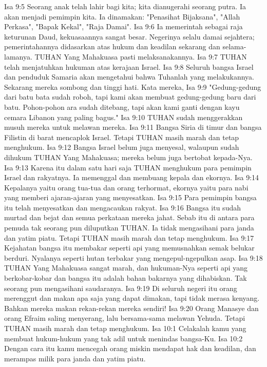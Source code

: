 Isa 9:5  Seorang anak telah lahir bagi kita; kita dianugerahi seorang putra. Ia akan menjadi pemimpin kita. Ia dinamakan: "Penasihat Bijaksana", "Allah Perkasa", "Bapak Kekal", "Raja Damai".
Isa 9:6  Ia memerintah sebagai raja keturunan Daud, kekuasaannya sangat besar. Negerinya selalu damai sejahtera; pemerintahannya didasarkan atas hukum dan keadilan sekarang dan selama-lamanya. TUHAN Yang Mahakuasa pasti melaksanakannya.
Isa 9:7  TUHAN telah menjatuhkan hukuman atas kerajaan Israel.
Isa 9:8  Seluruh bangsa Israel dan penduduk Samaria akan mengetahui bahwa Tuhanlah yang melakukannya. Sekarang mereka sombong dan tinggi hati. Kata mereka,
Isa 9:9  "Gedung-gedung dari batu bata sudah roboh, tapi kami akan membuat gedung-gedung baru dari batu. Pohon-pohon ara sudah ditebang, tapi akan kami ganti dengan kayu cemara Libanon yang paling bagus."
Isa 9:10  TUHAN sudah menggerakkan musuh mereka untuk melawan mereka.
Isa 9:11  Bangsa Siria di timur dan bangsa Filistin di barat mencaplok Israel. Tetapi TUHAN masih marah dan tetap menghukum.
Isa 9:12  Bangsa Israel belum juga menyesal, walaupun sudah dihukum TUHAN Yang Mahakuasa; mereka belum juga bertobat kepada-Nya.
Isa 9:13  Karena itu dalam satu hari saja TUHAN menghukum para pemimpin Israel dan rakyatnya. Ia memenggal dan membuang kepala dan ekornya.
Isa 9:14  Kepalanya yaitu orang tua-tua dan orang terhormat, ekornya yaitu para nabi yang memberi ajaran-ajaran yang menyesatkan.
Isa 9:15  Para pemimpin bangsa itu telah menyesatkan dan mengacaukan rakyat.
Isa 9:16  Bangsa itu sudah murtad dan bejat dan semua perkataan mereka jahat. Sebab itu di antara para pemuda tak seorang pun diluputkan TUHAN. Ia tidak mengasihani para janda dan yatim piatu. Tetapi TUHAN masih marah dan tetap menghukum.
Isa 9:17  Kejahatan bangsa itu membakar seperti api yang memusnahkan semak belukar berduri. Nyalanya seperti hutan terbakar yang mengepul-ngepulkan asap.
Isa 9:18  TUHAN Yang Mahakuasa sangat marah, dan hukuman-Nya seperti api yang berkobar-kobar dan bangsa itu adalah bahan bakarnya yang dihabiskan. Tak seorang pun mengasihani saudaranya.
Isa 9:19  Di seluruh negeri itu orang merenggut dan makan apa saja yang dapat dimakan, tapi tidak merasa kenyang. Bahkan mereka makan rekan-rekan mereka sendiri!
Isa 9:20  Orang Manasye dan orang Efraim saling menyerang, lalu bersama-sama melawan Yehuda. Tetapi TUHAN masih marah dan tetap menghukum.
Isa 10:1  Celakalah kamu yang membuat hukum-hukum yang tak adil untuk menindas bangsa-Ku.
Isa 10:2  Dengan cara itu kamu mencegah orang miskin mendapat hak dan keadilan, dan merampas milik para janda dan yatim piatu.
